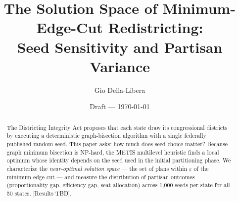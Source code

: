 \documentclass[12pt]{article}
\title{The Solution Space of Minimum-Edge-Cut Redistricting:\\
       Seed Sensitivity and Partisan Variance}
\author{Gio Della-Libera}
\date{Draft — \today}
\begin{document}
\maketitle

\begin{abstract}
  The Districting Integrity Act proposes that each state draw its congressional
  districts by executing a deterministic graph-bisection algorithm with a
  single federally published random seed. This paper asks: how much does seed
  choice matter? Because graph minimum bisection is NP-hard, the METIS
  multilevel heuristic finds a local optimum whose identity depends on the
  seed used in the initial partitioning phase. We characterize the
  \emph{near-optimal solution space} --- the set of plans within $\varepsilon$
  of the minimum edge cut --- and measure the distribution of partisan outcomes
  (proportionality gap, efficiency gap, seat allocation) across 1{,}000 seeds
  per state for all 50 states. [Results TBD].
\end{abstract}










\end{document}
